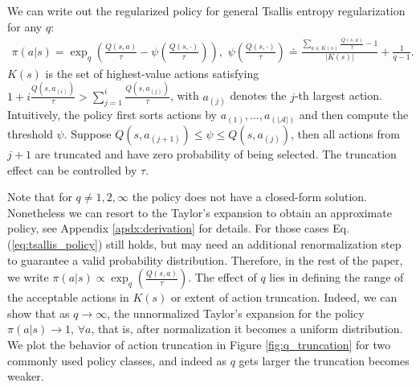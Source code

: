 \documentclass{article}
\newcommand{\AdaBracket}[1]{\left(#1\right)}
\newcommand{\eq}[1]{Eq.\,(#1)}
\begin{document}
We can write out the regularized policy for general Tsallis entropy regularization for any $q$\footnotemark{}:
\begin{align}
    \pi(a|s) = \exp_q \AdaBracket{\frac{Q(s,a)}{\tau } - {\psi}\AdaBracket{\frac{Q(s, \cdot)}{\tau }}}, \,\,
    {\psi}\AdaBracket{\frac{Q(s,\cdot)}{\tau}} \doteq \frac{\sum_{a\in K(s)} \frac{Q(s,a)}{\tau} - 1 }{|K{(s)}|} + \frac{1}{q-1}.
    \label{eq:tsallis_policy}
\end{align}
  $K(s)$ is the set of highest-value actions satisfying $1 \!+\! i\frac{Q(s,a_{(i)})}{\tau} \!>\! \sum_{j=1}^{i}\frac{Q(s,a_{(j)})}{\tau}$, with $a_{(j)}$ denotes the $j$-th largest action.
  Intuitively, the policy first sorts actions by $a_{(1)}, \dots, a_{(|\mathcal{A}|)}$ and then compute the threshold $\psi$.
  Suppose $Q(s, a_{(j+1)}) \leq \psi \leq Q(s, a_{(j)})$, then all actions from $j+1$ are truncated and have zero probability of being selected.
  The truncation effect can be controlled by $\tau$.
  
  Note that for $q\neq 1,2,\infty$ the policy does not have a closed-form solution. 
  Nonetheless we can resort to the Taylor's expansion to obtain an approximate policy, see Appendix \ref{apdx:derivation} for details. 
  For those cases \eq{\ref{eq:tsallis_policy}} still holds, but may need an additional renormalization step to guarantee a valid probability distribution. 
  Therefore, in the rest of the paper, we write $\pi(a|s) \propto \exp_q\AdaBracket{\frac{Q(s,a)}{\tau}}$.
  The effect of $q$ lies in defining the range of the acceptable actions in $K(s)$ or extent of action truncation. 
  Indeed, we can show that as $q \rightarrow \infty$, the unnormalized Taylor's expansion for the policy $\pi(a|s) \rightarrow 1, \, \forall a$, that is, after normalization it becomes a uniform distribution.
We plot the behavior of action truncation in Figure \ref{fig:q_truncation} for two commonly used policy classes, and indeed as $q$ gets larger the truncation becomes weaker.
\end{document}
